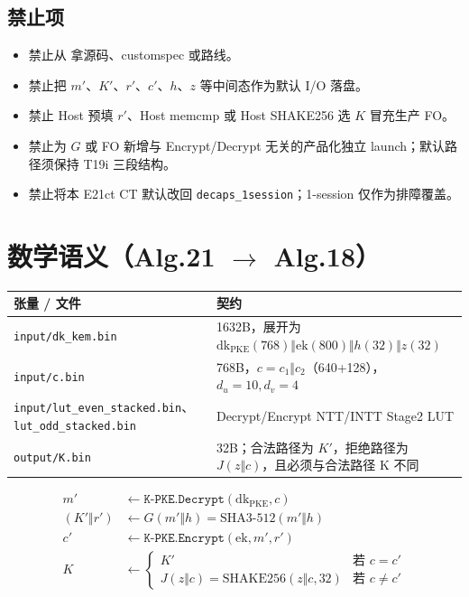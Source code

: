 \documentclass[UTF8,a4paper,11pt]{ctexart}
\newcommand{\dirname}[1]{\texttt{\seqsplit{#1}}}
\begin{document}
\subsection{禁止项}
\begin{itemize}
  \item 禁止从 \dirname{frozen/} 拿源码、customspec 或路线。
  \item 禁止把 $m'$、$K'$、$r'$、$c'$、$h$、$z$ 等中间态作为默认 I/O 落盘。
  \item 禁止 Host 预填 $r'$、Host memcmp 或 Host SHAKE256 选 $K$ 冒充生产 FO。
  \item 禁止为 $G$ 或 FO 新增与 Encrypt/Decrypt 无关的产品化独立 launch；默认路径须保持 T19i 三段结构。
  \item 禁止将本 E21ct CT 默认改回 \texttt{decaps\_1session}；1-session 仅作为排障覆盖。
\end{itemize}

\section{数学语义（Alg.21 $\to$ Alg.18）}

\begin{longtable}{@{}L{3.5cm}L{9.8cm}@{}}
\toprule
张量 / 文件 & 契约 \\
\midrule
\texttt{input/dk\_kem.bin} & 1632B，展开为 $\mathrm{dk}_{\mathrm{PKE}}(768)\Vert \mathrm{ek}(800)\Vert h(32)\Vert z(32)$ \\
\texttt{input/c.bin} & 768B，$c=c_1\Vert c_2$（640+128），$d_u=10,d_v=4$ \\
\texttt{input/lut\_even\_stacked.bin}、\texttt{lut\_odd\_stacked.bin} & Decrypt/Encrypt NTT/INTT Stage2 LUT \\
\texttt{output/K.bin} & 32B；合法路径为 $K'$，拒绝路径为 $J(z\Vert c)$，且必须与合法路径 K 不同 \\
\bottomrule
\end{longtable}

\begin{align*}
  m' &\leftarrow \texttt{K-PKE.Decrypt}(\mathrm{dk}_{\mathrm{PKE}}, c) \\
  (K'\Vert r') &\leftarrow G(m'\Vert h)=\mathrm{SHA3\textrm{-}512}(m'\Vert h) \\
  c' &\leftarrow \texttt{K-PKE.Encrypt}(\mathrm{ek}, m', r') \\
  K &\leftarrow
    \begin{cases}
      K' & \text{若 } c=c' \\
      J(z\Vert c)=\mathrm{SHAKE256}(z\Vert c,32) & \text{若 } c\neq c'
    \end{cases}
\end{align*}
\end{document}
